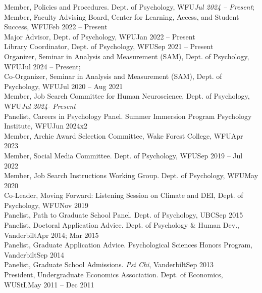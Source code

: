 Member, Policies and Procedures. Dept. of Psychology, WFU\hfill{\textit{Jul 2024 – Present};}\newline 
{}\smallskip\\
Member, Faculty Advising Board, Center for Learning, Access, and Student Success, WFU\hfill {Feb 2022 – Present}\\
Major Advisor, Dept. of Psychology, WFU\hfill{Jan 2022 – Present}\\
Library Coordinator, Dept. of Psychology, WFU\hfill {Sep 2021 – Present}\\
Organizer, Seminar in Analysis and Measurement (SAM), Dept. of Psychology, WFU\hfill{Jul 2024 – Present;}\newline 
{}\smallskip\\
Co-Organizer, Seminar in Analysis and Measurement (SAM), Dept. of Psychology, WFU\hfill {Jul 2020 – Aug 2021}\\
Member, Job Search Committee for Human Neuroscience, Dept. of Psychology, WFU\hfill {\textit{Jul 2024- Present}}\\
Panelist, Careers in Psychology Panel. Summer Immersion Program Psychology Institute, WFU\hfill {Jun 2024x2}\\ %
Member, Archie Award Selection Committee, Wake Forest College, WFU\hfill{Apr 2023}\\ 
Member, Social Media Committee. Dept. of Psychology, WFU\hfill {Sep 2019 – Jul 2022}\\
Member, Job Search Instructions Working Group. Dept. of Psychology, WFU\hfill{May 2020}\\
Co-Leader, Moving Forward: Listening Session on Climate and DEI, Dept. of Psychology, WFU\hfill {Nov 2019}\\
Panelist, Path to Graduate School Panel. Dept. of Psychology, UBC\hfill {Sep 2015}\\
Panelist, Doctoral Application Advice. Dept. of Psychology \& Human Dev., Vanderbilt\hfill {Apr 2014; Mar 2015}\\
Panelist, Graduate Application Advice. Psychological Sciences Honors Program, Vanderbilt\hfill {Sep 2014}\\
Panelist, Graduate School Admissions. \textit{Psi Chi}, Vanderbilt\hfill{Sep 2013}\\
President, Undergraduate Economics Association. Dept. of Economics, WUStL\hfill{May 2011 – Dec 2011}\\
